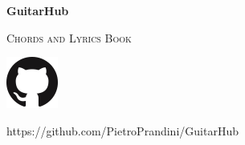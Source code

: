 
\begin{titlepage}
	\centering
	{\sffamily\huge\bfseries GuitarHub\par}
	{\ttfamily\scshape\Large Chords and Lyrics Book\par}
	\includegraphics[scale=1]{img/GitHub-Mark/PNG/GitHub-Mark-64px.png}\par %
	{\ttfamily\footnotesize https://github.com/PietroPrandini/GuitarHub\par}
\end{titlepage}

